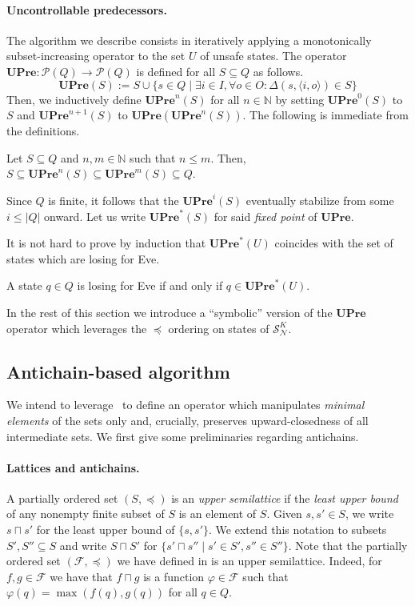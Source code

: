 \documentclass[runningheads,a4paper,draft]{llncs}
\let\phi\varphi
\newcommand{\pow}[1]{\mathcal{P}(#1)}
\newcommand{\upre}{\mathbf{UPre}}
\newcommand{\eve}{Eve\xspace}
\newcommand{\calF}{\mathcal{F}}
\newcommand{\calN}{\mathcal{N}}
\newcommand{\calS}{\mathcal{S}}
\begin{document}
\paragraph{Uncontrollable predecessors.} The algorithm we describe
consists in iteratively applying a monotonically subset-increasing operator to
the set $U$ of unsafe states. The operator $\upre\colon \pow{Q} \to \pow{Q}$ is
defined for all $S \subseteq Q$ as follows.
\[
  \upre(S) := S \cup \{s \in Q \mid \exists i \in I, \forall o \in O :
  \Delta(s,\langle i, o \rangle) \in S\}
\]
Then, we inductively define $\upre^n(S)$ for all $n \in \mathbb{N}$ by setting
$\upre^0(S)$ to $S$ and $\upre^{n+1}(S)$ to $\upre(\upre^{n}(S))$.
The following is immediate from the definitions.
\begin{lemma}
  Let $S \subseteq Q$ and $n, m \in \mathbb{N}$ such that $n \leq m$. Then,
  $S \subseteq \upre^n(S) \subseteq \upre^m(S) \subseteq Q$.
\end{lemma}
Since $Q$ is finite, it follows that the $\upre^i(S)$ eventually stabilize
from some $i \leq |Q|$ onward.  Let us write $\upre^*(S)$ for said \emph{fixed point}
of $\upre$.

It is not hard to prove by induction that $\upre^*(U)$ coincides with the set
of states which are losing for \eve.
\begin{proposition}
  A state $q \in Q$ is losing for \eve if and only if $q \in \upre^*(U)$.
\end{proposition}

In the rest of this section we introduce a ``symbolic'' version of the $\upre$
operator which leverages the $\preceq$ ordering on states of $\calS^K_\calN$.

\subsection{Antichain-based algorithm}
We intend to leverage~ to define an operator
which manipulates \emph{minimal elements} of the sets only and, crucially,
preserves upward-closedness of all intermediate sets. We first give some
preliminaries regarding antichains.

\paragraph{Lattices and antichains.} A partially ordered set $(S, \preceq)$ is
an \emph{upper semilattice} if the \emph{least upper bound} of any nonempty
finite subset of $S$ is an element of $S$. Given $s,s' \in S$, we write $s
\sqcap s'$ for the least upper bound of $\{s,s'\}$. We extend this notation
to subsets $S', S'' \subseteq S$ and write
$S \sqcap S'$ for $\{s' \sqcap s'' \mid s' \in S', s'' \in S''\}$. 
Note that the partially ordered set $(\calF,\preceq)$ we have defined in
 is an upper semilattice. Indeed, for $f, g \in \calF$ we have
that $f \sqcap g$ is a function $\phi \in \calF$ such that
\(
  \phi(q) = \max(f(q),g(q))
\)
for all $q \in Q$.
\end{document}
